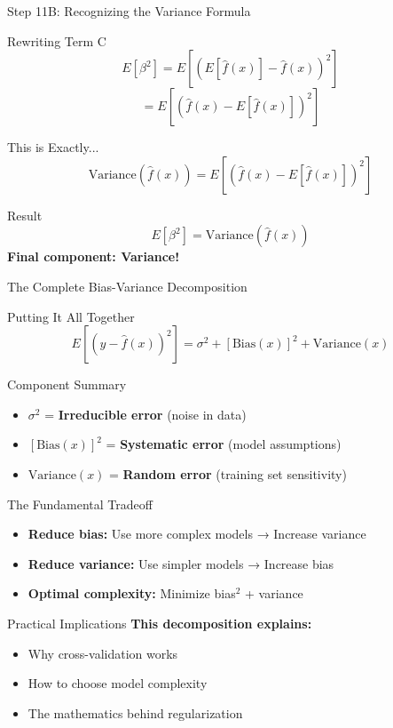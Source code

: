 \documentclass[10pt]{beamer}
\begin{document}
\begin{frame}{Step 11B: Recognizing the Variance Formula}
\begin{examplebox}{Rewriting Term C}
$$E[\beta^2] = E[(E[\hat{f}(x)] - \hat{f}(x))^2]$$
$$= E[(\hat{f}(x) - E[\hat{f}(x)])^2]$$
\end{examplebox}

\begin{keypointsbox}{This is Exactly...}
$$\text{Variance}(\hat{f}(x)) = E[(\hat{f}(x) - E[\hat{f}(x)])^2]$$
\end{keypointsbox}

\begin{alertbox}{Result}
$$\boxed{E[\beta^2] = \text{Variance}(\hat{f}(x))}$$
\textbf{Final component: Variance!}
\end{alertbox}
\end{frame}

\begin{frame}{The Complete Bias-Variance Decomposition}
\begin{alertbox}{Putting It All Together}
$$E[(y - \hat{f}(x))^2] = \sigma^2 + [\text{Bias}(x)]^2 + \text{Variance}(x)$$
\end{alertbox}

\begin{definitionbox}{Component Summary}
\begin{itemize}
\item $\sigma^2$ = \textbf{Irreducible error} (noise in data)
\item $[\text{Bias}(x)]^2$ = \textbf{Systematic error} (model assumptions)
\item $\text{Variance}(x)$ = \textbf{Random error} (training set sensitivity)
\end{itemize}
\end{definitionbox}

\begin{keypointsbox}{The Fundamental Tradeoff}
\begin{itemize}
\item \textbf{Reduce bias:} Use more complex models → Increase variance
\item \textbf{Reduce variance:} Use simpler models → Increase bias
\item \textbf{Optimal complexity:} Minimize bias$^2$ + variance
\end{itemize}
\end{keypointsbox}

\begin{examplebox}{Practical Implications}
\textbf{This decomposition explains:}
\begin{itemize}
\item Why cross-validation works
\item How to choose model complexity
\item The mathematics behind regularization
\end{itemize}
\end{examplebox}
\end{frame}
\end{document}
